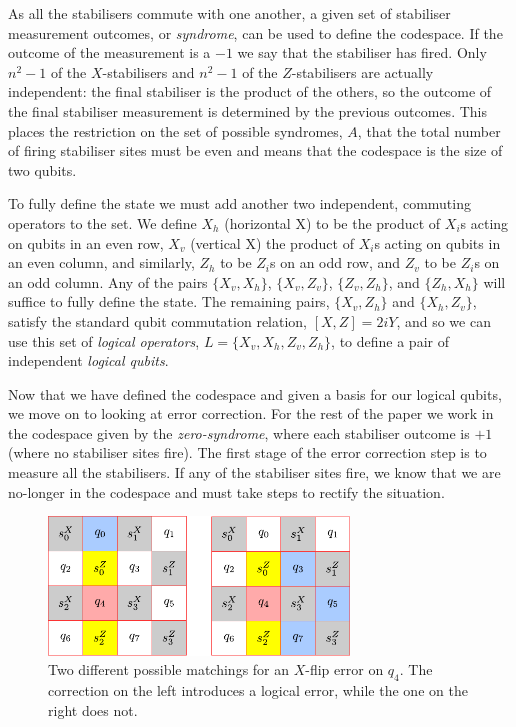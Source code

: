 As all the stabilisers commute with one another, a given set of stabiliser measurement outcomes, or {\it syndrome}, can be used to define the codespace. If the outcome of the measurement is a $-1$ we say that the stabiliser has fired. Only $n^2-1$ of the $X$-stabilisers and $n^2-1$ of the $Z$-stabilisers are actually independent: the final stabiliser is the product of the others, so the outcome of the final stabiliser measurement is determined by the previous outcomes. This places the restriction on the set of possible syndromes, $A$, that the total number of firing stabiliser sites must be even and means that the codespace is the size of two qubits.

To fully define the state we must add another two independent, commuting operators to the set. We define $X_h$ (horizontal X) to be the product of $X_i$s acting on qubits in an even row, $X_v$ (vertical X) the product of $X_i$s acting on qubits in an even column, and similarly, $Z_h$ to be $Z_i$s on an odd row, and $Z_v$ to be $Z_i$s on an odd column. Any of the pairs $\{X_v, X_h\}$, $\{X_v, Z_v\}$, $\{Z_v, Z_h\}$, and $\{Z_h, X_h\}$ will suffice to fully define the state. The remaining pairs, $\{X_v, Z_h\}$ and $\{X_h, Z_v\}$, satisfy the standard qubit commutation relation, $[X, Z] = 2iY$, and so we can use this set of \textit{logical operators}, $L = \{X_v, X_h, Z_v , Z_h\}$, to define a pair of independent \textit{logical qubits}. 

Now that we have defined the codespace and given a basis for our logical qubits, we move on to looking at error correction. For the rest of the paper we work in the codespace given by the \textit{zero-syndrome}, where each stabiliser outcome is $+1$ (where no stabiliser sites fire). The first stage of the error correction step is to measure all the stabilisers. If any of the stabiliser sites fire, we know that we are no-longer in the codespace and must take steps to rectify the situation.

\begin{figure}[htb]
  \begin{center}
    \includegraphics[width=8cm]{assets/4-code_error_correct.pdf}
  \end{center}
  \caption{Two different possible matchings for an $X$-flip error on $q_4$. The correction on the left introduces a logical error, while the one on the right does not.}
  \label{4-code_error_correct}
\end{figure}


